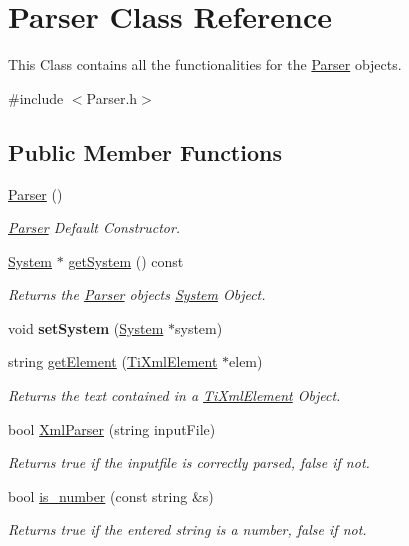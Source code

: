 \hypertarget{classParser}{}\section{Parser Class Reference}
\label{classParser}


This Class contains all the functionalities for the \hyperlink{classParser}{Parser} objects.  




{\ttfamily \#include $<$Parser.\+h$>$}

\subsection*{Public Member Functions}
\begin{DoxyCompactItemize}
\item 
\hyperlink{classParser_a12234f6cd36b61af4b50c94a179422c1}{Parser} ()\hypertarget{classParser_a12234f6cd36b61af4b50c94a179422c1}{}\label{classParser_a12234f6cd36b61af4b50c94a179422c1}

\begin{DoxyCompactList}\small\item\em \hyperlink{classParser}{Parser} Default Constructor. \end{DoxyCompactList}\item 
\hyperlink{classSystem}{System} $\ast$ \hyperlink{classParser_addad80574e43b744a82807d0f821d414}{get\+System} () const 
\begin{DoxyCompactList}\small\item\em Returns the \hyperlink{classParser}{Parser} object\textquotesingle{}s \hyperlink{classSystem}{System} Object. \end{DoxyCompactList}\item 
void {\bfseries set\+System} (\hyperlink{classSystem}{System} $\ast$system)\hypertarget{classParser_aaf58c6aafde4e7b889fbaa5d1f3aa6fe}{}\label{classParser_aaf58c6aafde4e7b889fbaa5d1f3aa6fe}

\item 
string \hyperlink{classParser_a36b746dbf631544851e0af2d0e7c6982}{get\+Element} (\hyperlink{classTiXmlElement}{Ti\+Xml\+Element} $\ast$elem)
\begin{DoxyCompactList}\small\item\em Returns the text contained in a \hyperlink{classTiXmlElement}{Ti\+Xml\+Element} Object. \end{DoxyCompactList}\item 
bool \hyperlink{classParser_aa8cdba8032e5d5d87b249be597b196c7}{Xml\+Parser} (string input\+File)
\begin{DoxyCompactList}\small\item\em Returns true if the inputfile is correctly parsed, false if not. \end{DoxyCompactList}\item 
bool \hyperlink{classParser_a9ae65850c9b4d607a539cbe14331db5f}{is\+\_\+number} (const string \&s)
\begin{DoxyCompactList}\small\item\em Returns true if the entered string is a number, false if not. \end{DoxyCompactList}\end{DoxyCompactItemize}
